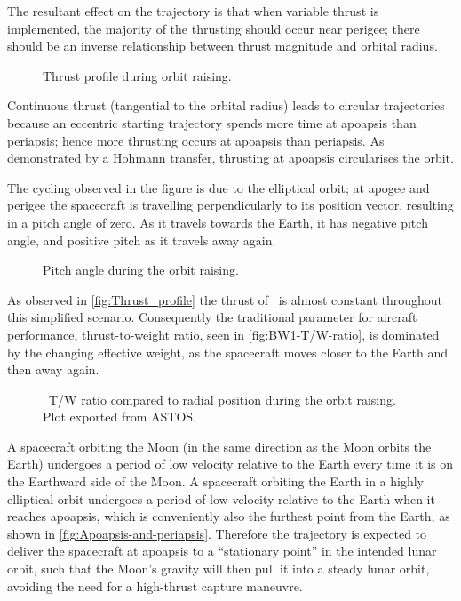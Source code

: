 The resultant effect on the trajectory is that when variable thrust is implemented, the majority of the thrusting should occur near perigee; there should be an inverse relationship between thrust magnitude and orbital radius. 

\begin{figure}
\centering
%
\caption{Thrust profile during orbit raising.}
\label{fig:Thrust_profile}
\end{figure}

Continuous thrust (tangential to the orbital radius) leads to circular trajectories because an eccentric starting trajectory spends more time at apoapsis than periapsis; hence more thrusting occurs at apoapsis than periapsis. As demonstrated by a Hohmann transfer, thrusting at apoapsis circularises the orbit.

The cycling observed in the figure is due to the elliptical orbit; at apogee and perigee the spacecraft is travelling perpendicularly to its position vector, resulting in a pitch angle of zero. As it travels towards the Earth, it has negative pitch angle, and positive pitch as it travels away again.
 
\begin{figure}
\centering
%
\caption{Pitch angle during the orbit raising.}
\label{fig:BW1-Pitch}
\end{figure}

As observed in \autoref{fig:Thrust_profile} the thrust of \BW\ is almost constant throughout this simplified scenario. Consequently the traditional parameter for aircraft performance, thrust-to-weight ratio, seen in \autoref{fig:BW1-T/W-ratio}, is dominated by the changing effective weight, as the spacecraft moves closer to the Earth and then away again.

\begin{figure}
\centering
%
\caption{\BW\ T/W ratio compared to radial position during the orbit raising. Plot exported from ASTOS.}
\label{fig:BW1-T/W-ratio}
\end{figure}

A spacecraft orbiting the Moon (in the same direction as the Moon orbits the Earth) undergoes a period of low velocity relative to the Earth every time it is on the Earthward side of the Moon. A spacecraft orbiting the Earth in a highly elliptical orbit undergoes a period of low velocity relative to the Earth when it reaches apoapsis, which is conveniently also the furthest point from the Earth, as shown in \autoref{fig:Apoapsis-and-periapsis}. Therefore the trajectory is expected to deliver the spacecraft at apoapsis to a \enquote{stationary point} in the intended lunar orbit, such that the Moon's gravity will then pull it into a steady lunar orbit, avoiding the need for a high-thrust capture maneuvre.

